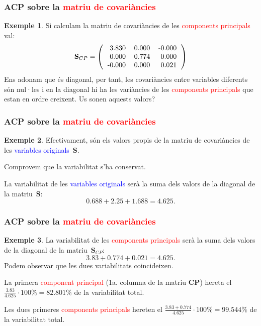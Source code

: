 \documentclass[12pt,t]{beamer}
\newcommand{\red}[1]{\textcolor{red}{#1}}
\newcommand{\blue}[1]{\textcolor{blue}{#1}}
\theoremstyle{plain}
\theoremstyle{definition}
\newtheorem{exemple}{Exemple}
\begin{document}
\begin{frame}
\frametitle{ACP sobre la \red{matriu de covariàncies}}
\begin{exemple}
Si calculam la matriu de covariàncies de les \red{components principals} val:
\[
\mathbf{S}_{CP}=\left(
\begin{tabular}{rrr}
  3.830 & 0.000 & -0.000 \\ 
  0.000 & 0.774 & 0.000 \\ 
  -0.000 & 0.000 & 0.021 \\ 
  \end{tabular}\right)
\]
Ens adonam que és diagonal, per tant, les covariàncies entre variables diferents són nul·les i en la diagonal hi ha les variàncies de les \red{components principals} que estan en ordre creixent. Us sonen aquests valors?
\end{exemple}
\end{frame}

\begin{frame}
\frametitle{ACP sobre la \red{matriu de covariàncies}}
\begin{exemple}
Efectivament, són els valors propis de la matriu de covariàncies de les \blue{variables originals}~$\mathbf{S}$.
\bigskip

Comprovem que la variabilitat s'ha conservat. 
\medskip

La variabilitat de les \blue{variables originals} serà la suma dels valors de la diagonal de la matriu~$\mathbf{S}$:
\[
0.688 + 2.25 + 1.688 = 4.625.
\]
\end{exemple}
\end{frame}


\begin{frame}
\frametitle{ACP sobre la \red{matriu de covariàncies}}
\begin{exemple}
La variabilitat de les \red{components principals} serà la suma dels valors de la diagonal de la matriu~$\mathbf{S}_{CP}$:
\[
3.83 + 0.774 + 0.021 = 4.625.
\]
Podem observar que les dues variabilitats coincideixen.
\medskip

La primera \red{component principal} (1a. columna de la matriu $\mathbf{CP}$) hereta el $\frac{3.83}{4.625}\cdot 100\% = 
82.801\%$ de la variabilitat total.

Les dues primeres \red{components principals} hereten el 
$\frac{3.83 + 0.774}{4.625}\cdot 100\% = 
99.544\%$ de la variabilitat total.
\end{exemple}
\end{frame}
\end{document}
